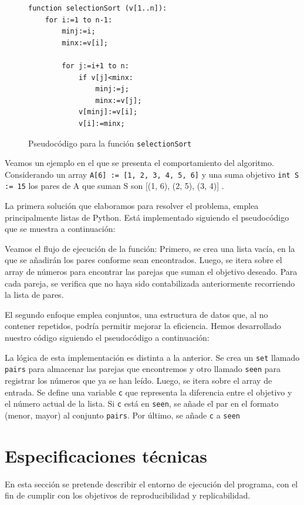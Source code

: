 \documentclass[a4paper, titlepage]{article}
\begin{document}
\begin{figure}[H]
\begin{verbatim}
function selectionSort (v[1..n]):
	for i:=1 to n-1:
		minj:=i;
		minx:=v[i];
		
		for j:=i+1 to n:
			if v[j]<minx:
				minj:=j;
				minx:=v[j];
			v[minj]:=v[i];
			v[i]:=minx;
\end{verbatim}
\label{pseudo_selection}
\caption{Pseudocódigo para la función \texttt{selectionSort}}
\end{figure}

Veamos un ejemplo en el que se presenta el comportamiento del algoritmo. Considerando un array  \texttt{A[6] := [1, 2, 3, 4, 5, 6]} y una suma objetivo \texttt{int S := 15} los pares de A que suman S son [(1, 6), (2, 5), (3, 4)] .

La primera solución que elaboramos para resolver el problema, emplea principalmente listas de Python. Está implementado siguiendo el pseudocódigo que se muestra a continuación:


Veamos el flujo de ejecución de la función: Primero, se crea una lista vacía, en la que se añadirán los pares conforme sean encontrados. Luego, se itera sobre el array de números para encontrar las parejas que suman el objetivo deseado. Para cada pareja, se verifica que no haya sido contabilizada anteriormente recorriendo la lista de pares.


El segundo enfoque emplea conjuntos, una estructura de datos que, al no contener repetidos, podría permitir mejorar la eficiencia. Hemos desarrollado nuestro código siguiendo el pseudocódigo a continuación:


La lógica de esta implementación es distinta a la anterior. Se crea un \texttt{set} llamado \texttt{pairs} para almacenar las parejas que encontremos y otro llamado \texttt{seen} para registrar los números que ya se han leído. Luego, se itera sobre el array de entrada. Se define una variable \texttt{c} que representa la diferencia entre el objetivo y el número actual de la lista. Si \texttt{c} está en \texttt{seen}, se añade el par en el formato (menor, mayor) al conjunto \texttt{pairs}. Por último, se añade \texttt{c} a \texttt{seen}


\section{Especificaciones técnicas}

En esta sección se pretende describir el entorno de ejecución del programa, con el fin de cumplir con los objetivos de reproducibilidad y replicabilidad.
\end{document}
